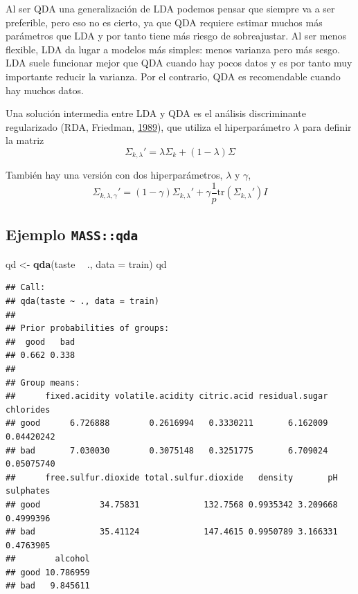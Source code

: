 \documentclass[
  spanish,
]{book}
\newenvironment{Shaded}{\begin{snugshade}}{\end{snugshade}}
\newcommand{\DataTypeTok}[1]{\textcolor[rgb]{0.13,0.29,0.53}{#1}}
\newcommand{\KeywordTok}[1]{\textcolor[rgb]{0.13,0.29,0.53}{\textbf{#1}}}
\newcommand{\NormalTok}[1]{#1}
\newcommand{\OperatorTok}[1]{\textcolor[rgb]{0.81,0.36,0.00}{\textbf{#1}}}
\newcommand{\StringTok}[1]{\textcolor[rgb]{0.31,0.60,0.02}{#1}}
\theoremstyle{break}
\theoremstyle{definition}
\theoremstyle{definition}
\theoremstyle{definition}
\theoremstyle{remark}
\begin{document}
Al ser QDA una generalización de LDA podemos pensar que siempre va a ser preferible, pero eso no es cierto, ya que QDA requiere estimar muchos más parámetros que LDA y por tanto tiene más riesgo de sobreajustar. Al ser menos flexible, LDA da lugar a modelos más simples: menos varianza pero más sesgo. LDA suele funcionar mejor que QDA cuando hay pocos datos y es por tanto muy importante reducir la varianza. Por el contrario, QDA es recomendable cuando hay muchos datos.

Una solución intermedia entre LDA y QDA es el análisis discriminante regularizado (RDA, Friedman, \protect\hyperlink{ref-friedman1989regularized}{1989}), que utiliza el hiperparámetro \(\lambda\) para definir la matriz
\[\Sigma_{k,\lambda}' = \lambda\Sigma_k + (1 - \lambda) \Sigma
\]

También hay una versión con dos hiperparámetros, \(\lambda\) y \(\gamma\),
\[\Sigma_{k,\lambda,\gamma}' = (1 - \gamma) \Sigma_{k,\lambda}' + \gamma \frac{1}{p} \mbox{tr} (\Sigma_{k,\lambda}')I
\]

\hypertarget{ejemplo-massqda}{%
\subsection{\texorpdfstring{Ejemplo \texttt{MASS::qda}}{Ejemplo MASS::qda}}\label{ejemplo-massqda}}

\begin{Shaded}
\begin{Highlighting}[]
\NormalTok{qd <-}\StringTok{ }\KeywordTok{qda}\NormalTok{(taste }\OperatorTok{~}\StringTok{ }\NormalTok{., }\DataTypeTok{data =}\NormalTok{ train)}
\NormalTok{qd}
\end{Highlighting}
\end{Shaded}

\begin{verbatim}
## Call:
## qda(taste ~ ., data = train)
## 
## Prior probabilities of groups:
##  good   bad 
## 0.662 0.338 
## 
## Group means:
##      fixed.acidity volatile.acidity citric.acid residual.sugar  chlorides
## good      6.726888        0.2616994   0.3330211       6.162009 0.04420242
## bad       7.030030        0.3075148   0.3251775       6.709024 0.05075740
##      free.sulfur.dioxide total.sulfur.dioxide   density       pH sulphates
## good            34.75831             132.7568 0.9935342 3.209668 0.4999396
## bad             35.41124             147.4615 0.9950789 3.166331 0.4763905
##        alcohol
## good 10.786959
## bad   9.845611
\end{verbatim}
\end{document}
